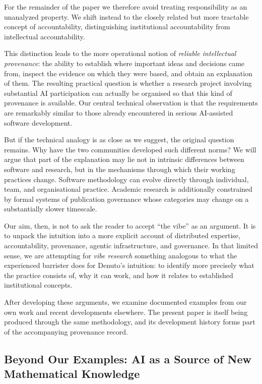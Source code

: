For the remainder of the paper we therefore avoid treating responsibility as an unanalyzed property. We shift instead to the closely related but more tractable concept of accountability, distinguishing institutional accountability from intellectual accountability.

This distinction leads to the more operational notion of \emph{reliable intellectual provenance}: the ability to establish where important ideas and decisions came from, inspect the evidence on which they were based, and obtain an explanation of them. The resulting practical question is whether a research project involving substantial AI participation can actually be organised so that this kind of provenance is available. Our central technical observation is that the requirements are remarkably similar to those already encountered in serious AI-assisted software development.

But if the technical analogy is as close as we suggest, the original question remains. Why have the two communities developed such different norms? We will argue that part of the explanation may lie not in intrinsic differences between software and research, but in the mechanisms through which their working practices change. Software methodology can evolve directly through individual, team, and organisational practice. Academic research is additionally constrained by formal systems of publication governance whose categories may change on a substantially slower timescale.

Our aim, then, is not to ask the reader to accept ``the vibe'' as an argument. It is to unpack the intuition into a more explicit account of distributed expertise, accountability, provenance, agentic infrastructure, and governance. In that limited sense, we are attempting for \emph{vibe research} something analogous to what the experienced barrister does for Denuto's intuition: to identify more precisely what the practice consists of, why it can work, and how it relates to established institutional concepts.

After developing these arguments, we examine documented examples from our own work and recent developments elsewhere. The present paper is itself being produced through the same methodology, and its development history forms part of the accompanying provenance record.



\subsection{Beyond Our Examples: AI as a Source of New Mathematical Knowledge}

